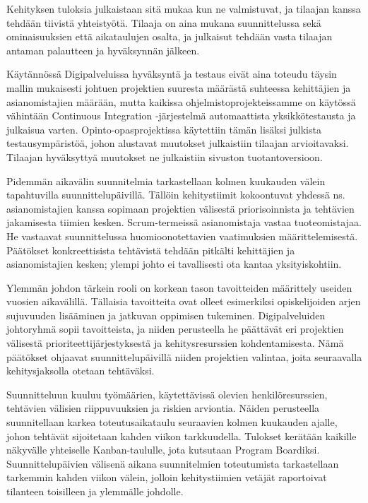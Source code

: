 \documentclass{article}
\begin{document}
Kehityksen tuloksia julkaistaan sitä mukaa kun ne valmistuvat, ja
tilaajan kanssa tehdään tiivistä yhteis\-työtä. Tilaaja on aina mukana
suunnittelussa sekä ominaisuuksien että aikataulujen osalta, ja julkaisut
tehdään vasta tilaajan antaman palautteen ja hyväksynnän jälkeen.

Käytännössä Digipalveluissa hyväksyntä ja testaus eivät aina toteudu täysin
mallin mukaisesti johtuen projektien suuresta määrästä suhteessa kehittäjien ja
asianomistajien määrään, mutta kaikissa ohjel\-mistoprojekteissamme on käytössä
vähintään Continuous Integration -järjestelmä automaattista yksikkö\-testausta
ja julkaisua varten. Opinto-opasprojektissa käytettiin tämän lisäksi julkista
testausympäristöä, johon alustavat muutokset julkaistiin tilaajan
arvioitavaksi. Tilaajan hyväksyttyä muutokset ne julkaistiin sivuston
tuotantoversioon.

Pidemmän aikavälin suunnitelmia tarkastellaan kolmen kuukauden välein
tapahtuvilla suunnittelu\-päivillä. Tällöin kehitystiimit kokoontuvat yhdessä
ns. asianomistajien kanssa sopimaan projektien välisestä priorisoinnista ja
tehtävien jakamisesta tiimien kesken. Scrum-termeissä asianomistaja vastaa
tuoteomistajaa. He vastaavat suunnittelussa huomioonotettavien vaatimuksien
määrittelemisestä. Päätökset konkreettisista tehtävis\-tä tehdään pitkälti
kehittäjien ja asianomistajien kes\-ken; ylempi johto ei tavallisesti ota
kantaa yksityiskohtiin.

Ylemmän johdon tärkein rooli on korkean tason tavoitteiden määrittely useiden
vuosien aikavälillä. Tällaisia tavoitteita ovat olleet esimerkiksi
opiskelijoiden arjen sujuvuuden lisääminen ja jatkuvan oppimisen tukeminen.
Digipalveluiden johtoryhmä sopii tavoitteista, ja niiden perusteella he
päättävät eri projektien välisestä prioriteetti\-jär\-jes\-tyksestä ja
kehitysresurssien kohdentamisesta. Nämä päätökset ohjaavat suunnittelupäivillä
niiden projektien valintaa, joita seuraavalla kehitysjaksolla otetaan
tehtäväksi.

Suunnitteluun kuuluu työmäärien, käytettävissä olevien henkilöresurssien,
tehtävien välisien riippuvuuksien ja riskien arviontia. Näiden perusteella
suunnitellaan karkea toteutusaikataulu seuraavien kolmen kuukauden ajalle,
johon tehtävät sijoitetaan kahden viikon tarkkuudella.  Tulokset kerätään
kaikille näkyvälle yhtei\-selle Kanban-taululle, jota kutsutaan Program
Boardiksi. Suunnittelupäivien välisenä aikana suunnitelmien toteutumista
tarkastellaan tarkemmin kahden viikon välein, jolloin kehitystii\-mien
vetä\-jät raportoivat tilanteen toisilleen ja ylemmälle johdolle.
\end{document}
